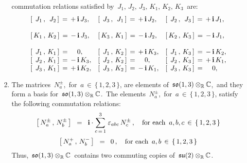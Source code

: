 \begin{corollary}
\begin{enumerate}
	commutation relations satisfied by
	\,$J_{1},\, J_{2},\, J_{3},\, K_{1},\, K_{2},\, K_{3}$\,
	are:
	\begin{equation*}
	\begin{array}{lll}
	\left[\,\;J_{1}\,,\,\;J_{2}\,\right] \,=\, + \, \i \, J_{3}, &
	\left[\,\;J_{3}\,,\,\;J_{1}\,\right] \,=\, + \, \i \, J_{2}, &
	\left[\,\;J_{2}\,,\,\;J_{3}\,\right] \,=\, + \, \i \, J_{1},
	\\ \\
	\left[\,K_{1}\,,\,K_{2}\,\right] \,=\, - \, \i \, J_{3}, &
	\left[\,K_{3}\,,\,K_{1}\,\right] \,=\, - \, \i \, J_{2}, &
	\left[\,K_{2}\,,\,K_{3}\,\right] \,=\, - \, \i \, J_{1},
	\\ \\
	\left[\,\;J_{1}\,,\,K_{1}\,\right] \,=\, {\color{white}-}\,0,\;\;\;\; &
	\left[\,\;J_{1}\,,\,K_{2}\,\right] \,=\, + \, \i \, K_{3}, &
	\left[\,\;J_{1}\,,\,K_{3}\,\right] \,=\, - \, \i \, K_{2},
	\\
	\left[\,\;J_{2}\,,\,K_{1}\,\right] \,=\, - \, \i \, K_{3}, &
	\left[\,\;J_{2}\,,\,K_{2}\,\right] \,=\, {\color{white}-}\,0,\;\;\;\; &
	\left[\,\;J_{2}\,,\,K_{3}\,\right] \,=\, + \, \i \, K_{1},
	\\
	\left[\,\;J_{3}\,,\,K_{1}\,\right] \,=\, + \, \i \, K_{2}, &
	\left[\,\;J_{3}\,,\,K_{2}\,\right] \,=\, - \, \i \, K_{1}, &
	\left[\,\;J_{3}\,,\,K_{3}\,\right] \,=\, {\color{white}-}\,0,\;\;\;\;
	\end{array}
	\end{equation*}
\item
	The matrices
	\,$N^{\pm}_{a}$,\, for \,$a \,\in\, \{\,1,2,3\,\}$,
	are elements of
	\,$\mathfrak{so}(1,3) \otimes_{\mathbb{R}} \mathbb{C}$,\, and they form a basis for \,$\mathfrak{so}(1,3) \otimes_{\mathbb{R}} \mathbb{C}$.\,
	The elements
	\,$N^{\pm}_{a}$,\, for \,$a \,\in\, \{\,1,2,3\,\}$,
	satisfy the following commutation relations:
	\begin{equation*}
	\left[\,N^{\pm}_{a}\,,\,N^{\pm}_{b}\,\right]
	\;\;=\;\;
		\textnormal{\bf i} \cdot \overset{3}{\underset{c\,=\,1}{\sum}} \;\varepsilon_{abc} \, N^{\pm}_{c}\,,
	\quad
	\textnormal{for each \,$a, b, c \,\in\, \{\,1, 2, 3\,\}$}
	\end{equation*}
	\begin{equation*}
	\left[\,N^{+}_{a}\,,\,N^{-}_{b}\,\right] \;\;=\;\; 0\,,
	\quad
	\textnormal{for each \,$a, b \,\in\, \{\,1, 2, 3\,\}$}
	\end{equation*}
	Thus,
	\,$\mathfrak{so}(1,3) \otimes_{\mathbb{R}} \mathbb{C}$\,
	contains two commuting copies of
	\,$\mathfrak{su}(2) \otimes_{\mathbb{R}} \mathbb{C}$.\,
\end{enumerate}
\end{corollary}
\proof

